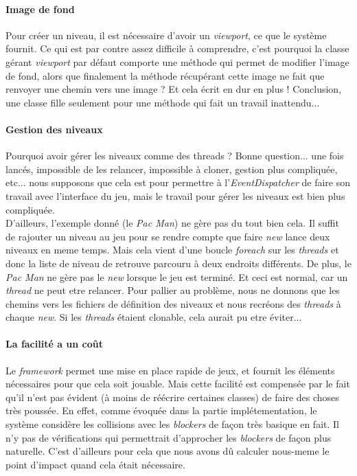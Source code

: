 \documentclass[a4paper,10pt]{article}
\begin{document}
    \paragraph{Image de fond}
        Pour créer un niveau, il est nécessaire d'avoir un \textit{viewport}, ce que le système fournit. Ce qui est
        par contre assez difficile à comprendre, c'est pourquoi la classe gérant \textit{viewport} par défaut
        comporte une méthode qui permet de modifier l'image de fond, alors que finalement la méthode récupérant
        cette image ne fait que renvoyer une chemin vers une image ? Et cela écrit en dur en plus ! Conclusion, une classe
        fille seulement pour une méthode qui fait un travail inattendu...

    \paragraph{Gestion des niveaux}
        Pourquoi avoir gérer les niveaux comme des threads ? Bonne question... une fois lancés, impossible de les
        relancer, impossible à cloner, gestion plus compliquée, etc... nous supposons que cela est pour permettre
        à l'\textit{EventDispatcher} de faire son travail avec l'interface du jeu, mais le travail pour gérer
        les niveaux est bien plus compliquée. \\
        D'ailleurs, l'exemple donné (le \textit{Pac Man}) ne gère pas du
        tout bien cela. Il suffit de rajouter un niveau au jeu pour se rendre compte que faire \textit{new} lance
        deux niveaux en meme temps. Mais cela vient d'une boucle \textit{foreach} sur les \textit{threads} et donc
        la liste de niveau de retrouve parcouru à deux endroits différents. De plus, le \textit{Pac Man} ne gère
        pas le \textit{new} lorsque le jeu est terminé. Et ceci est normal, car un \textit{thread} ne peut etre
        relancer. Pour pallier au problème, nous ne donnons que les chemins vers les fichiers de définition des
        niveaux et nous recréons des \textit{threads} à chaque \textit{new}. Si les \textit{threads} étaient
        clonable, cela aurait pu etre éviter...

    \paragraph{La facilité a un coût}
        Le \textit{framework} permet une mise en place rapide de jeux, et fournit les éléments nécessaires pour
        que cela soit jouable. Mais cette facilité est compensée par le fait qu'il n'est pas évident (à moins
        de réécrire certaines classes) de faire des choses très poussée. En effet, comme évoquée dans la partie
        implétementation, le système considère les collisions avec les \textit{blockers} de façon très basique
        en fait. Il n'y pas de vérifications qui permettrait d'approcher les \textit{blockers} de façon plus
        naturelle. C'est d'ailleurs pour cela que nous avons dû calculer nous-meme le point d'impact quand cela
        était nécessaire.
\end{document}
